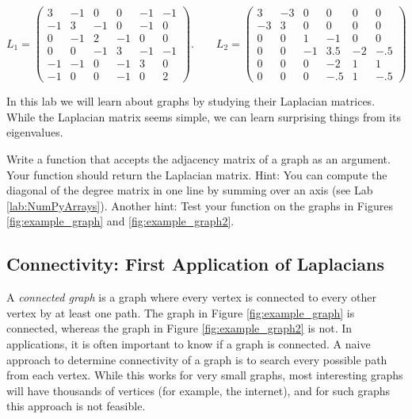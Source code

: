 \[
L_1 = \begin{pmatrix}
3 & -1 & 0 & 0 & -1 & -1\\
-1 & 3 & -1 & 0 & -1 & 0\\
0 & -1 & 2 & -1 & 0 & 0\\
0 & 0 & -1 & 3 & -1 & -1\\
-1 & -1 & 0 & -1 & 3& 0\\
-1 & 0 & 0 & -1 & 0 & 2
\end{pmatrix}. \qquad L_2 = 
 \begin{pmatrix}
3 & -3 & 0 & 0 & 0 & 0\\
-3 & 3 & 0 & 0 & 0 & 0\\
0 & 0 & 1 & -1 & 0 & 0\\
0 & 0 & -1 & 3.5 & -2 & -.5\\
0 & 0 & 0 & -2 & 1 & 1\\
0 & 0 & 0 &- .5 & 1 & -.5
\end{pmatrix}
\]


In this lab we will learn about graphs by studying their Laplacian matrices.
While the Laplacian matrix seems simple, we can learn surprising things from its eigenvalues.


\begin{problem}
Write a function that accepts the adjacency matrix of a graph as an argument. 
Your function should return the Laplacian matrix. 
Hint: You can compute the diagonal of the degree matrix in one line by summing over an axis (see Lab \ref{lab:NumPyArrays}).
Another hint: Test your function on the graphs in Figures \ref{fig:example_graph} and \ref{fig:example_graph2}.
\label{prob:laplacian}
\end{problem}



\subsection*{Connectivity: First Application of Laplacians}

A \emph{connected graph} is a graph where every vertex is connected to every other vertex by at least one path.
The graph in Figure \ref{fig:example_graph} is connected, whereas the graph in Figure \ref{fig:example_graph2} is not.
In applications, it is often important to know if a graph is connected.
A naive approach to determine connectivity of a graph is to search every possible path from each vertex.
While this works for very small graphs, most interesting graphs will have thousands of vertices (for example, the internet), and for such graphs this approach is not feasible.

